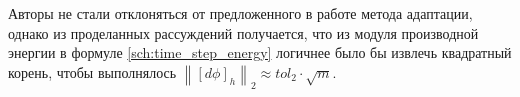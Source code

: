 Авторы не стали отклоняться от предложенного в работе \cite{zhang_time_step} метода адаптации, однако из проделанных рассуждений получается, что из модуля производной энергии в формуле \eqref{sch:time_step_energy} логичнее было бы извлечь квадратный корень, чтобы выполнялось $\left\| [d \phi]_h \right\|_2 \approx tol_2 \cdot \sqrt{m}$.